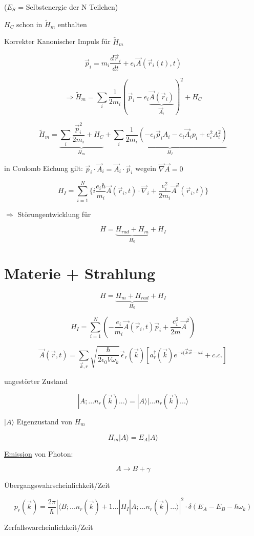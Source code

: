 (\(E_S\) = Selbstenergie der N Teilchen)

\(H_C\) schon in \(\tilde H_m\) enthalten

Korrekter Kanonischer Impuls für \(\tilde H_m\)

\[\vec p_i = m_i\frac{d\vec r_i}{dt}+e_i\vec A(\vec r_i(t),t)\]

\[\Rightarrow \tilde H_m = \sum_i\frac{1}{2m_i}(\vec p_i-e_i\underbrace{\vec A(\vec r_i)}_{\vec A_i})^2+H_C\]


\[\tilde H_m = \underbrace{\sum_i \frac{\vec p_i^2}{2m_i}+H_C}_{H_m} + \underbrace{\sum_i \frac{1}{2m_i}(-e_i\vec p_i A_i-e_i\vec A_ip_i+e^2_iA^2_i)}_{H_I}\]

in Coulomb Eichung gilt: \(\vec p_i\cdot\vec A_i = \vec A_i\cdot\vec p_i\) wegein \(\vec\nabla\vec A = 0\)

\[H_I = \sum_{i=1}^N \{ i\frac{e_i\hbar}{m_i}\vec A(\vec r_i,t)\cdot\vec\nabla_i + \frac{ e^2_i}{2m_i}\vec A^2(\vec r_i,t) \}\]

\(\Rightarrow \) Störungentwicklung für

\[H = \underbrace{H_{rad}+H_m}_{H_0} + H_I\]


\section{Materie + Strahlung}

\[H = \underbrace{H_m+H_{rad}}_{H_0}+H_I\]

\[H_I = \sum_{i=1}^{N}(-\frac{e_i}{m_i}\vec A(\vec r_i,t)\vec p_i + \frac{e_i^2}{2m}\vec A^2)\]

\[\vec A(\vec r,t) =\sum_{\vec k,r}\sqrt{\frac{\hbar}{2\epsilon_0V\omega_k}}\vec\epsilon_r(\vec k)[a^\dagger_r(\vec k) e^{-i(\vec k\vec x-\omega t}+c.c.]\]

ungestörter Zustand

\[|A;...n_r(\vec k) ...\rangle  = |A\rangle |...n_r(\vec k)...\rangle \]


\(|A\rangle \) Eigenzustand von \(H_m\)

\[H_m|A\rangle  = E_A|A\rangle \]

\underline{Emission} von Photon:

\[A\rightarrow B+\gamma\]

Übergangswahrscheinlichkeit/Zeit

\[p_r(\vec k) = \frac{2\pi}{\hbar}|\langle B;...n_r(\vec k)+1...|H_I|A;...n_r(\vec k)...\rangle |^2\cdot\delta(E_A-E_B-\hbar\omega_k)\]

Zerfallswarcheinlichkeit/Zeit

